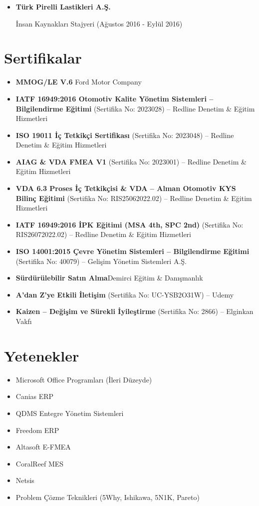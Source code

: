 \documentclass[
  letterpaper,
  DIV=11,
  numbers=noendperiod]{scrartcl}
\providecommand{\tightlist}{%
  \setlength{\itemsep}{0pt}\setlength{\parskip}{0pt}}
\begin{document}
\begin{itemize}
\item
  \textbf{Türk Pirelli Lastikleri A.Ş.}

  İnsan Kaynakları Stajyeri (Ağustos 2016 - Eylül 2016)
\end{itemize}

\section{Sertifikalar}\label{sertifikalar}

\begin{itemize}
\item
  \textbf{MMOG/LE V.6} Ford Motor Company
\item
  \textbf{IATF 16949:2016 Otomotiv Kalite Yönetim Sistemleri --
  Bilgilendirme Eğitimi} (Sertifika No: 2023028) -- Redline Denetim \&
  Eğitim Hizmetleri
\item
  \textbf{ISO 19011 İç Tetkikçi Sertifikası} (Sertifika No: 2023048) --
  Redline Denetim \& Eğitim Hizmetleri
\item
  \textbf{AIAG \& VDA FMEA V1} (Sertifika No: 2023001) -- Redline
  Denetim \& Eğitim Hizmetleri
\item
  \textbf{VDA 6.3 Proses İç Tetkikçisi \& VDA -- Alman Otomotiv KYS
  Bilinç Eğitimi} (Sertifika No: RIS25062022.02) -- Redline Denetim \&
  Eğitim Hizmetleri
\item
  \textbf{IATF 16949:2016 İPK Eğitimi (MSA 4th, SPC 2nd)} (Sertifika No:
  RIS26072022.02) -- Redline Denetim \& Eğitim Hizmetleri
\item
  \textbf{ISO 14001:2015 Çevre Yönetim Sistemleri -- Bilgilendirme
  Eğitimi} (Sertifika No: 40079) -- Gelişim Yönetim Sistemleri A.Ş.
\item
  \textbf{Sürdürülebilir Satın Alma}Demirci Eğitim \& Danışmanlık
\item
  \textbf{A'dan Z'ye Etkili İletişim} (Sertifika No: UC-YSB2O31W) --
  Udemy
\item
  \textbf{Kaizen -- Değişim ve Sürekli İyileştirme} (Sertifika No: 2866)
  -- Elginkan Vakfı
\end{itemize}

\section{Yetenekler}\label{yetenekler}

\begin{itemize}
\tightlist
\item
  Microsoft Office Programları (İleri Düzeyde)
\item
  Canias ERP
\item
  QDMS Entegre Yönetim Sistemleri
\item
  Freedom ERP
\item
  Altasoft E-FMEA
\item
  CoralReef MES
\item
  Netsis
\item
  Problem Çözme Teknikleri (5Why, Ishikawa, 5N1K, Pareto)
\end{itemize}
\end{document}
